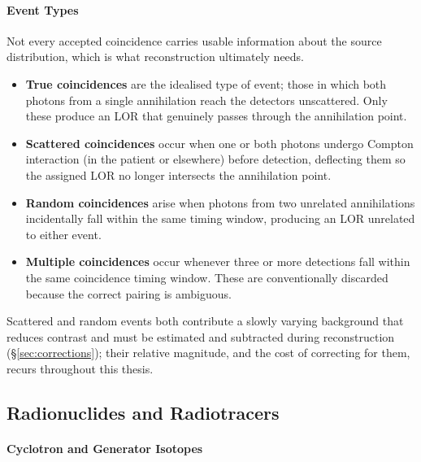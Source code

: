 \paragraph{Event Types}
Not every accepted coincidence carries usable information about the source distribution, which is what reconstruction ultimately needs.

\begin{itemize}
	\item \textbf{True coincidences} are the idealised type of event; those in which both photons from a single annihilation reach the detectors unscattered. Only these produce an LOR that genuinely passes through the annihilation point.
	\item \textbf{Scattered coincidences} occur when one or both photons undergo Compton interaction (in the patient or elsewhere) before detection, deflecting them so the assigned LOR no longer intersects the annihilation point.
	\item \textbf{Random coincidences} arise when photons from two unrelated annihilations incidentally fall within the same timing window, producing an LOR unrelated to either event.
	\item \textbf{Multiple coincidences} occur whenever three or more detections fall within the same coincidence timing window. These are conventionally discarded because the correct pairing is ambiguous.
\end{itemize}
Scattered and random events both contribute a slowly varying background that reduces contrast and must be estimated and subtracted during reconstruction (\S\ref{sec:corrections}); their relative magnitude, and the cost of correcting for them, recurs throughout this thesis.

\subsection{Radionuclides and Radiotracers}
\label{sec:radiotracers}

\paragraph{Cyclotron and Generator Isotopes}

